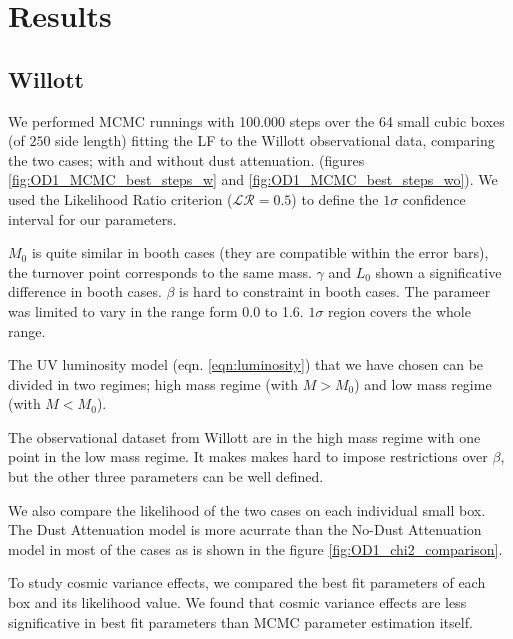 \documentclass{emulateapj}
\newcommand{\hMpc}{{\ifmmode{h^{-1}{\rm Mpc}}\else{$h^{-1}$Mpc }\fi}}
\begin{document}
\section{Results}
\label{sec:results}

\subsection{Willott}

We performed MCMC runnings with 100.000 steps over the 64 small 
cubic boxes (of $250$ \hMpc side length) fitting the LF to the 
Willott observational data, comparing the two cases; with and 
without dust attenuation. (figures \ref{fig:OD1_MCMC_best_steps_w} and 
\ref{fig:OD1_MCMC_best_steps_wo}). 
We used the Likelihood Ratio criterion ($\mathcal{LR}= 0.5$) to
define the $1\sigma$ confidence interval for our parameters.

$M_0$ is quite similar in booth cases (they are compatible within 
the error bars), the turnover point corresponds to the same mass.
$\gamma$ and $L_0$ shown a significative difference in booth cases.
$\beta$ is hard to constraint in booth cases. 
The parameer was limited to vary in the range form 0.0 to 1.6. 
$1\sigma$ region covers the whole range.

The UV luminosity model (eqn. \ref{eqn:luminosity}) that we have 
chosen can be divided in two regimes; high mass regime 
(with $M > M_0$) and low mass regime (with $M < M_0$).

The observational dataset from Willott are in the high mass regime 
with one point in the low mass regime. It makes makes hard to impose
restrictions over $\beta$, but the other three parameters can be
well defined.

We also compare the likelihood of the two cases on each individual 
small box. The Dust Attenuation model is more acurrate than the
No-Dust Attenuation model in most of the cases as is shown in the figure 
\ref{fig:OD1_chi2_comparison}.

To study cosmic variance effects, we compared the best fit parameters
of each box and its likelihood value. We found that cosmic variance
effects are less significative in best fit parameters than MCMC parameter
estimation itself. 
\end{document}
